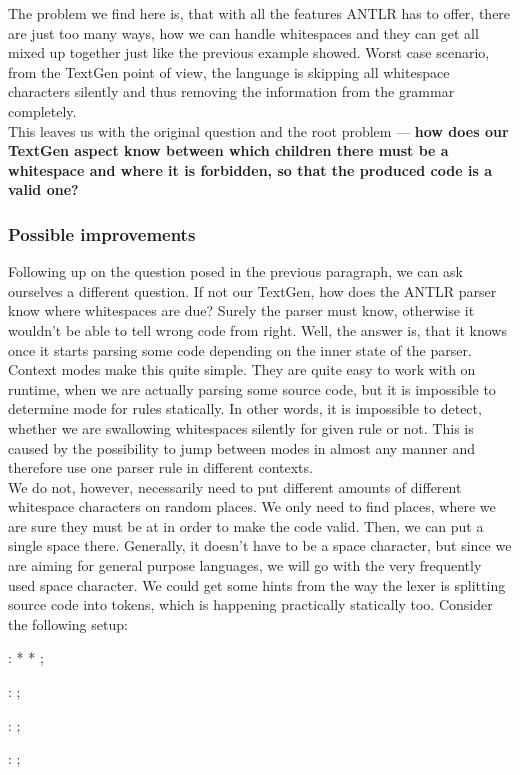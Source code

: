The problem we find here is, that with all the features ANTLR has to offer, there are just too many ways, how we can handle whitespaces and they can get all mixed up together just like the previous example showed.
Worst case scenario, from the TextGen point of view, the language is skipping all whitespace characters silently and thus removing the information from the grammar completely.
\\

This leaves us with the original question and the root problem --- \textbf{how does our TextGen aspect know between which children there must be a whitespace and where it is forbidden, so that the produced code is a valid one?}

\subsubsection{Possible improvements}

Following up on the question posed in the previous paragraph, we can ask ourselves a different question.
If not our TextGen, how does the ANTLR parser know where whitespaces are due?
Surely the parser must know, otherwise it wouldn't be able to tell wrong code from right.
Well, the answer is, that it knows once it starts parsing some code depending on the inner state of the parser.
Context modes make this quite simple.
They are quite easy to work with on runtime, when we are actually parsing some source code, but it is impossible to determine mode for rules statically.
In other words, it is impossible to detect, whether we are swallowing whitespaces silently for given rule or not.
This is caused by the possibility to jump between modes in almost any manner and therefore use one parser rule in different contexts.
\\

We do not, however, necessarily need to put different amounts of different whitespace characters on random places.
We only need to find places, where we are sure they must be at in order to make the code valid.
Then, we can put a single space there.
Generally, it doesn't have to be a space character, but since we are aiming for general purpose languages, we will go with the very frequently used space character.
We could get some hints from the way the lexer is splitting source code into tokens, which is happening practically statically too. Consider the following setup:

\begin{antlr}
	    :   \literal{<}  * \literal{>} * \literal{</}  \literal{>} ;

	  :       ;

	       :    ;

	       :   \regex{~[<"]*} ;
\end{antlr}

